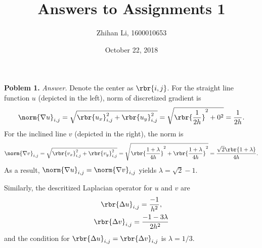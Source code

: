 \documentclass[english, nochinese]{pnote}
\title{Answers to Assignments 1}
\author{Zhihan Li, 1600010653}
\date{October 22, 2018}
\begin{document}
\maketitle

\textbf{Poblem 1.} \textit{Answer.} Denote the center as $ \rbr{ i, j } $. For the straight line function $u$ (depicted in the left), norm of discretized gradient is
\begin{equation}
\norm{ \nabla u }_{ i, j } = \sqrt{ \rbr{u_x}_{ i, j }^2 + \rbr{u_y}_{ i, j } ^2 } = \sqrt{ \rbr{\frac{1}{ 2 h }}^2 + 0^2 } = \frac{1}{ 2 h }.
\end{equation}
For the inclined line $v$ (depicted in the right), the norm is
\begin{equation}
\norm{ \nabla v }_{ i, j } = \sqrt{ \rbr{v_x}_{ i, j }^2 + \rbr{v_y}_{ i, j } ^2 } = \sqrt{ \rbr{\frac{ 1 + \lambda }{ 4 h }}^2 + \rbr{\frac{ 1 + \lambda }{ 4 h }}^2 } = \frac{ \sqrt{2} \rbr{ 1 + \lambda } }{ 4 h }.
\end{equation}
As a result, $ \norm{ \nabla u }_{ i, j } = \norm{ \nabla v }_{ i, j } $ yields $ \lambda = \sqrt{2} - 1 $.

Similarly, the descritized Laplacian operator for $u$ and $v$ are
\begin{gather}
\rbr{ \Delta u }_{ i, j } = \frac{-1}{h^2}, \\
\rbr{ \Delta v }_{ i, j } = \frac{ -1 - 3 \lambda }{ 2 h^2 }
\end{gather}
and the condition for $ \rbr{ \Delta u }_{ i, j } = \rbr{ \Delta v }_{ i, j } $ is $ \lambda = 1 / 3 $.
\end{document}

